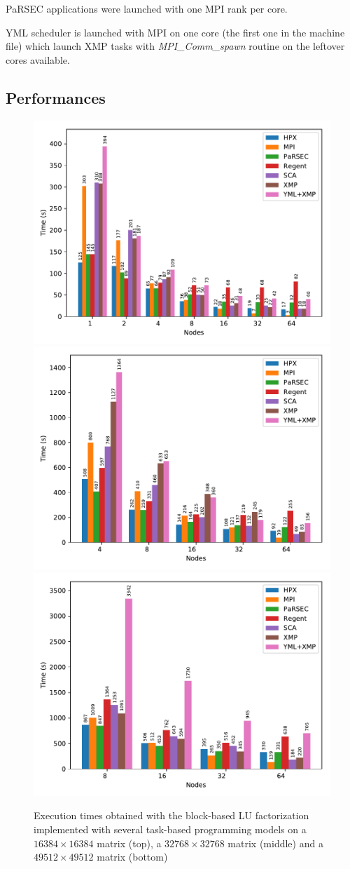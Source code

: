 PaRSEC applications were launched with one MPI rank per core.

YML scheduler is launched with MPI on one core (the first one in the machine file) which launch XMP tasks with \textit{MPI\_Comm\_spawn} routine on the leftover cores available.

\subsection{Performances}
\begin{figure}[h]
	\centering
	\includegraphics[width=.55\linewidth]{fig_strong_scaling_bar_task}
	\includegraphics[width=.55\linewidth]{fig_strong_scaling_bar_task_32k}
	\includegraphics[width=.55\linewidth]{fig_strong_scaling_bar_task_49k}
	\caption{Execution times obtained with the block-based LU factorization implemented with several task-based programming models on a $16384 \times 16384$ matrix (top), a $32768 \times 32768$ matrix (middle) and a $49512 \times 49512$ matrix (bottom)\label{fig:perf}}
\end{figure}


